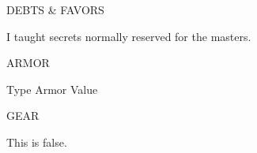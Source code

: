 {\begin{lrbox}{\dossierrightbarbox}
{\begin{minipage}[b][\textheight][t]{0.215\linewidth}
\begin{dossierbox}{5.2cm}{3cm}{DEBTS \& FAVORS}
\begin{adjustwidth*}{0cm}{.2cm}
I taught \underline{\hspace{3cm}} secrets normally reserved
for the masters.
\end{adjustwidth*}
\vspace{.5cm}
\end{dossierbox}%
\begin{dossierbox}{5.2cm}{3cm}{ARMOR}
\begin{adjustwidth*}{0cm}{.2cm}
\vspace{-.2cm}
{\oswaldfont\fontsize{14pt}{0em}\selectfont Type \hspace{2.6cm} Armor Value }
\vspace{.2cm}
\underline{\hspace{5cm}}
\end{adjustwidth*}
\end{dossierbox}%
\begin{dossierbox}{5.2cm}{3cm}{GEAR}
\begin{adjustwidth*}{0cm}{.2cm}
\vspace{.2cm}
\setlength{\baselineskip}{.5cm}
\underline{\hspace{5cm}}
\underline{\hspace{5cm}}
\underline{\hspace{5cm}}
\underline{\hspace{5cm}}
\underline{\hspace{5cm}}
\underline{\hspace{5cm}}
\underline{\hspace{5cm}}
\underline{\hspace{5cm}}
\underline{\hspace{5cm}}
\underline{\hspace{5cm}}
\underline{\hspace{5cm}}
\underline{\hspace{5cm}}
\underline{\hspace{5cm}}
\underline{\hspace{5cm}}
\underline{\hspace{5cm}}
\underline{\hspace{5cm}}
\underline{\hspace{5cm}}
\underline{\hspace{5cm}}
\underline{\hspace{5cm}}
\underline{\hspace{5cm}}
\end{adjustwidth*}
\end{dossierbox}%
\end{minipage}
}{
  This is false.
}
\end{lrbox}
\usebox{\dossierrightbarbox}}



